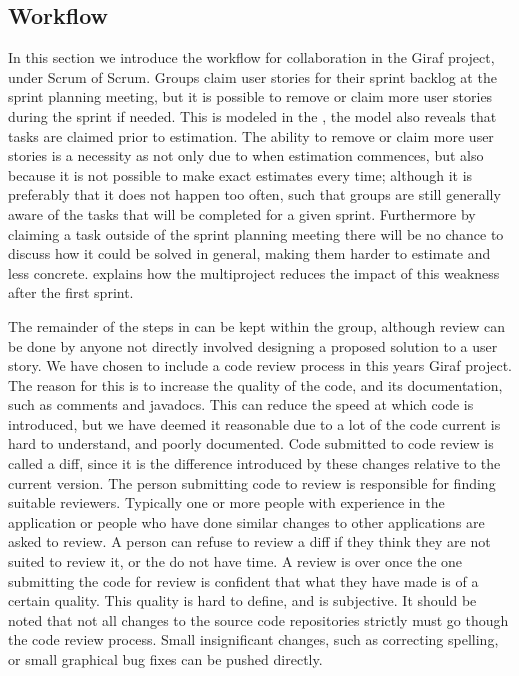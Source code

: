 \subsection*{Workflow}
In this section we introduce the workflow for collaboration in the Giraf project, under Scrum of Scrum. 
Groups claim user stories for their sprint backlog at the sprint planning meeting, but it is possible to remove or claim more user stories during the sprint if needed. 
This is modeled in the , the model also reveals that tasks are claimed prior to estimation.
The ability to remove or claim more user stories is a necessity as not only due to when estimation commences, but also because it is not possible to make exact estimates every time; although it is preferably that it does not happen too often, such that groups are still generally aware of the tasks that will be completed for a given sprint.
Furthermore by claiming a task outside of the sprint planning meeting there will be no chance to discuss how it could be solved in general, making them harder to estimate and less concrete.
 explains how the multiproject reduces the impact of this weakness after the first sprint.

\bigskip 
\noindent
The remainder of the steps in  can be kept within the group, although review can be done by anyone not directly involved designing a proposed solution to a user story.
We have chosen to include a code review process in this years Giraf project. 
The reason for this is to increase the quality of the code, and its documentation, such as comments and javadocs. 
This can reduce the speed at which code is introduced, but we have deemed it reasonable due to a lot of the code current is hard to understand, and poorly documented. 
Code submitted to code review is called a diff, since it is the difference introduced by these changes relative to the current version. 
The person submitting code to review is responsible for finding suitable reviewers.
Typically one or more people with experience in the application or people who have done similar changes to other applications are asked to review.
A person can refuse to review a diff if they think they are not suited to review it, or the do not have time. 
A review is over once the one submitting the code for review is confident that what they have made is of a certain quality.
This quality is hard to define, and is subjective.
It should be noted that not all changes to the source code repositories strictly must go though the code review process.
Small insignificant changes, such as correcting spelling, or small graphical bug fixes can be pushed directly. 

